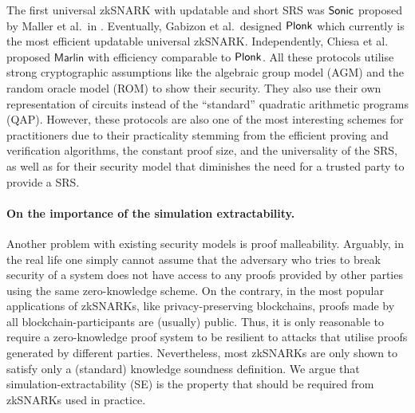 \documentclass[runningheads,11pt]{llncs}
\theoremstyle{definition} \newtheorem{definition}[theorem]{Definition}
\begin{document}
The first universal zkSNARK with updatable and short SRS was ${\textnormal{\textsf{Sonic}}}$ proposed
by Maller et al.~in \cite{CCS:MBKM19}. Eventually, Gabizon et al.~designed
$\textnormal{\textsf{Plonk}}$ \cite{EPRINT:GabWilCio19} which currently is the most efficient
updatable universal zkSNARK. Independently, Chiesa et al.~\cite{EC:CHMMVW20}
proposed $\textsf{Marlin}$ with efficiency comparable to $\textnormal{\textsf{Plonk}}$.
%
All these protocols utilise strong cryptographic assumptions like the algebraic
group model (AGM) and the random oracle model (ROM) to show their security. They
also use their own representation of circuits instead of the ``standard''
quadratic arithmetic programs (QAP). However, these protocols are also one of
the most interesting schemes for practitioners due to their practicality
stemming from the efficient proving and verification algorithms, the constant proof size, and the
universality of the SRS, as well as for their security model that diminishes the
need for a trusted party to provide a SRS.


\paragraph{On the importance of the simulation extractability.}
Another problem with existing security models is proof malleability.  Arguably,
in the real life one simply cannot assume that the adversary who tries to break
security of a system does not have access to any proofs provided by other
parties using the same zero-knowledge scheme. On the contrary, in the most
popular applications of zkSNARKs, like privacy-preserving blockchains, proofs
made by all blockchain-participants are (usually) public. Thus, it is only
reasonable to require a zero-knowledge proof system to be resilient to attacks
that utilise proofs generated by different parties.  Nevertheless, most zkSNARKs
are only shown to satisfy only a (standard) knowledge soundness definition. We
argue that simulation-extractability (SE) is the property that should be
required from zkSNARKs used in practice.
\end{document}
